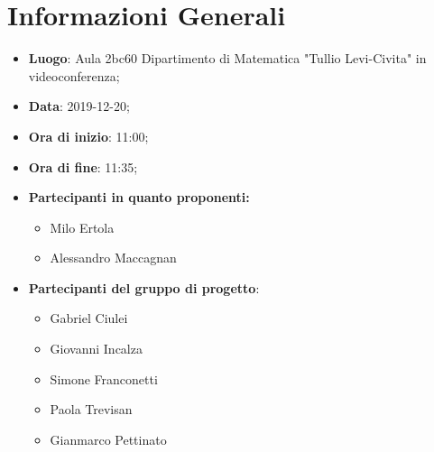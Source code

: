 \section{Informazioni Generali}
	\begin{itemize}
		\item \textbf {Luogo}: Aula 2bc60 Dipartimento di Matematica "Tullio Levi-Civita" in videoconferenza;
		\item \textbf {Data}: 2019-12-20;
		\item \textbf {Ora di inizio}: 11:00;
		\item \textbf {Ora di fine}: 11:35;
		\item \textbf {Partecipanti in quanto proponenti:}
		  \begin{itemize}
		    \item Milo Ertola
		    \item Alessandro Maccagnan
		  \end{itemize}
		\item \textbf {Partecipanti del gruppo di progetto}:
			\begin{itemize}
				\item Gabriel Ciulei
				\item Giovanni Incalza
				\item Simone Franconetti
				\item Paola Trevisan
				\item Gianmarco Pettinato
			\end{itemize}
	\end{itemize}
